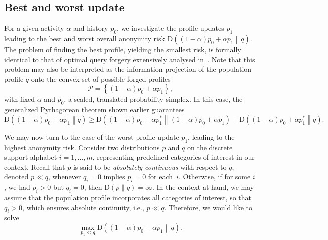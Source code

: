 \subsection{Best and worst update}
\label{sec:1-6}

\noindent
For a given activity $\alpha$ and history $p_0$, we investigate the profile updates $p_1$ leading to the best and worst overall anonymity risk $\mathrm{D}\left((1-\alpha)p_0+\alpha p_1\middle\|q\right)$. The problem of finding the best profile, yielding the smallest risk, is formally identical to that of optimal query forgery extensively analysed in~\cite{rebollo2010optimized}. Note that this problem may also be interpreted as the information projection of the population profile $q$ onto the convex set of possible forged profiles
\begin{equation*}
\mathscr{P}=\left\{(1-\alpha)p_0+\alpha p_1\right\},
\end{equation*}
with fixed $\alpha$ and $p_0$, a scaled, translated probability simplex. In this case, the generalized Pythagorean theorem shown earlier guarantees
\begin{equation*}
\mathrm{D}\left((1-\alpha)p_0+\alpha p_1\middle\|q\right)\geqslant\mathrm{D}\left((1-\alpha)p_0+\alpha p_1^*\middle\|(1-\alpha)p_0+\alpha p_1\right)+\mathrm{D}\left((1-\alpha)p_0+\alpha p_1^*\middle\|q\right).
\end{equation*}

We may now turn to the case of the worst profile update $p_1$, leading to the highest anonymity risk. Consider two distributions $p$ and $q$ on the discrete support alphabet $i=1,\dots,m$, representing predefined categories of interest in our context. Recall that $p$ is said to be \emph{absolutely continuous} with respect to $q$, denoted $p\ll q$, whenever $q_i=0$ implies $p_i=0$ for each~$i$. Otherwise, if for some $i$, we had $p_i>0$ but $q_i=0$, then $\mathrm{D}(p\|q)=\infty$. In the context at hand, we may assume that the population profile incorporates all categories of interest, so that $q_i>0$, which ensures absolute continuity, i.e., $p\ll q$. Therefore, we would like to solve 
\begin{equation*}
\max_{p_1\ll q} \mathrm{D}\left((1-\alpha)p_0+\alpha p_1\middle\|q\right).
\end{equation*}

